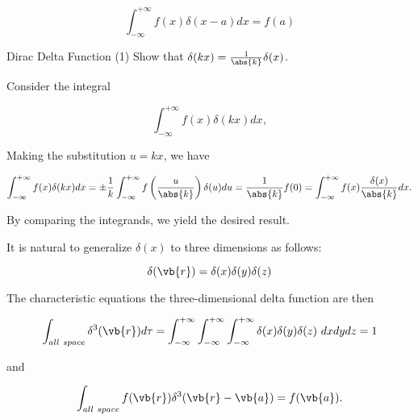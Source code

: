 \documentclass[english,a4paper,12pt]{report}
\begin{document}
\begin{equation} 
	\int_{-\infty}^{+\infty} f(x) \delta(x-a) dx = f(a) 
\end{equation}
	
\example
{Dirac Delta Function (1)}
{Show that \(\delta(kx) = \frac{1}{\abs{k}}\delta(x)\).}
{Consider the integral
			
\begin{equation} 
	\int_{-\infty}^{+\infty} f(x) \delta(kx) dx, 
\end{equation}

Making the substitution \(u=kx\), we have
			
\begin{equation} 
	\int_{-\infty}^{+\infty} f(x) \delta(kx) dx = \pm \frac{1}{k} \int_{-\infty}^{+\infty} f\left(\frac{u}{\abs{k}}\right) \delta(u) du = \frac{1}{\abs{k}} f(0) = \int_{-\infty}^{+\infty} f(x) \frac{\delta(x)}{\abs{k}} dx.
\end{equation}
			
By comparing the integrands, we yield the desired result.}	
		

	
It is natural to generalize \(\delta(x)\) to three dimensions as follows:
	
\begin{equation} 
	\delta(\vb{r}) = \delta(x)\delta(y)\delta(z) 
\end{equation}
	
The characteristic equations the three-dimensional delta function are then 
	

\begin{equation} 
	\int_{all~space} \delta^3(\vb{r})
	d\tau = \int_{-\infty}^{+\infty}\int_{-\infty}^{+\infty}\int_{-\infty}^{+\infty} \delta(x)\delta(y)\delta(z) ~dxdydz = 1 
\end{equation}
	
and
	
\begin{equation} 
	\int_{all~space} f(\vb{r}) \delta^3(\vb{r} - \vb{a}) = f(\vb{a}). 
\end{equation} 
	
\end{document}

